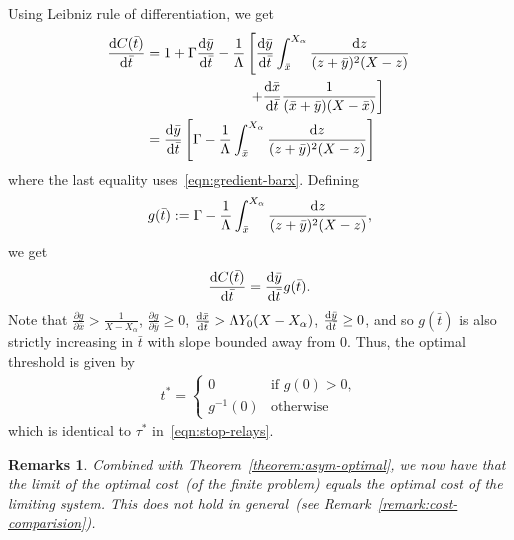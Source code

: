 \documentclass[10pt,journal,letterpaper]{IEEEtran}
\newtheorem{remarks}{Remarks}[section]
\begin{document}
\begin{IEEEproof}
\[\]
Using Leibniz rule of differentiation, we get
\begin{align*}
\frac{{\rm d}C(\bar{t})}{{\rm d}\bar{t}} &= 1 + \Gamma \frac{{\rm d}\bar{y}}{{\rm d}\bar{t}} -\frac{1}{\Lambda} \left[\frac{{\rm d}\bar{y}}{{\rm d}\bar{t}}\int_{\bar{x}}^{X_{\alpha}}\frac{{\rm d}z}{(z + \bar{y})^2(X - z)} \right. \\
     & \ \ \ \ \ \ \ \ \ \ \ \ \ \ \ \ \ \ \ \ \ \ \left. + \frac{{\rm d}\bar{x}}{{\rm d}\bar{t}}\frac{1}{(\bar{x} + \bar{y})(X - \bar{x})} \right]      \\
 &=  \frac{{\rm d}\bar{y}}{{\rm d}\bar{t}} \left[\Gamma - \frac{1}{\Lambda}\int_{\bar{x}}^{X_{\alpha}}\frac{{\rm d}z}{(z + \bar{y})^2(X - z)} \right]
\end{align*}
where the last equality uses~\eqref{eqn:gredient-barx}. Defining
\[g(\bar{t}) := \Gamma - \frac{1}{\Lambda}\int_{\bar{x}}^{X_{\alpha}}\frac{{\rm d}z}{(z + \bar{y})^2(X - z)},\]
we get
\[\frac{{\rm d}C(\bar{t})}{{\rm d}\bar{t}} = \frac{{\rm d}\bar{y}}{{\rm d}\bar{t}}g(\bar{t}).\]
Note that $\frac{\partial g}{\partial \bar{x}} > \frac{1}{X - X_{\alpha}}$, $\frac{\partial g}{\partial \bar{y}} \geq 0$,
$\frac{{\rm d}\bar{x}}{{\rm d}\bar{t}} > \Lambda Y_0(X - X_{\alpha})$, $\frac{{\rm d}\bar{y}}{{\rm d}\bar{t}} \geq 0$, 
and so $g(\bar{t})$ is also strictly increasing in $\bar{t}$ with slope bounded away from $0$.
Thus, the optimal threshold is given by
\begin{align*}
t^{\ast} = \left\{ \begin{array}{ll}
                 0 &\mbox{if } g(0) > 0,\\
                 g^{-1}(0) &\mbox{otherwise}\end{array} \right.
\end{align*}
which is identical to $\tau^{\ast}$ in~\eqref{eqn:stop-relays}.
\end{IEEEproof}
\begin{remarks}
Combined with Theorem~\ref{theorem:asym-optimal}, we now have that the limit of the optimal cost~(of the finite problem) equals the
optimal cost of the limiting system. This does not hold in general~(see Remark~\ref{remark:cost-comparision}).
\end{remarks}



\end{document}
